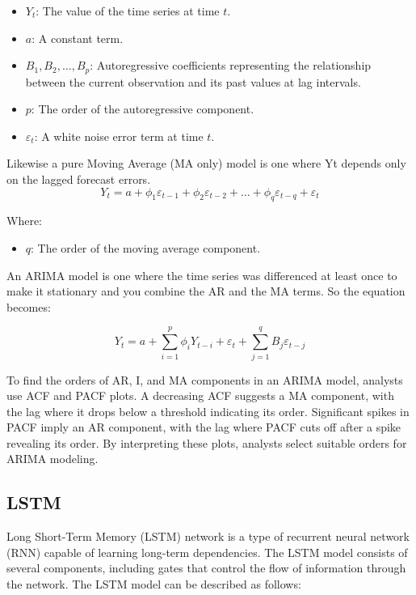 \documentclass{ieeeojies}
\begin{document}
\begin{itemize}
    \item $Y_t$: The value of the time series at time $t$.
    \item $a$: A constant term.
    \item $B_1, B_2, \ldots, B_p$: Autoregressive coefficients representing the relationship between the current observation and its past values at lag intervals.
    \item $p$: The order of the autoregressive component.
    \item $\varepsilon_t$: A white noise error term at time $t$.
\end{itemize}
Likewise a pure Moving Average (MA only) model is one where Yt depends only on the lagged forecast errors.
\begin{equation*}
Y_t = a + \phi_1 \varepsilon_{t-1} + \phi_2 \varepsilon_{t-2} + \ldots + \phi_q \varepsilon_{t-q} + \varepsilon_t
\end{equation*}

Where:

\begin{itemize}
    \item $q$: The order of the moving average component.
\end{itemize}

An ARIMA model is one where the time series was differenced at least once to make it stationary and you combine the AR and the MA terms. So the equation becomes:

\begin{equation*}
Y_t = a + \sum_{i=1}^{p} \phi_i Y_{t-i} + \varepsilon_t + \sum_{j=1}^{q} B_j \varepsilon_{t-j}
\end{equation*}

To find the orders of AR, I, and MA components in an ARIMA model, analysts use ACF and PACF plots. A decreasing ACF suggests a MA component, with the lag where it drops below a threshold indicating its order. Significant spikes in PACF imply an AR component, with the lag where PACF cuts off after a spike revealing its order. By interpreting these plots, analysts select suitable orders for ARIMA modeling.

\subsection{LSTM}
Long Short-Term Memory (LSTM) network is a type of recurrent neural network (RNN) capable of learning long-term dependencies. The LSTM model consists of several components, including gates that control the flow of information through the network. The LSTM model can be described as follows:
\end{document}
